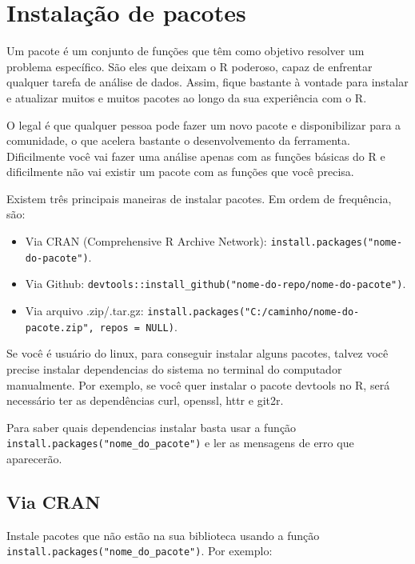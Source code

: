 \documentclass[
]{book}
\providecommand{\tightlist}{%
  \setlength{\itemsep}{0pt}\setlength{\parskip}{0pt}}
\begin{document}
\hypertarget{instalauxe7uxe3o-de-pacotes}{%
\section{Instalação de pacotes}\label{instalauxe7uxe3o-de-pacotes}}

Um pacote é um conjunto de funções que têm como objetivo resolver um problema específico. São eles que deixam o R poderoso, capaz de enfrentar qualquer tarefa de análise de dados. Assim, fique bastante à vontade para instalar e atualizar muitos e muitos pacotes ao longo da sua experiência com o R.

O legal é que qualquer pessoa pode fazer um novo pacote e disponibilizar para a comunidade, o que acelera bastante o desenvolvemento da ferramenta. Dificilmente você vai fazer uma análise apenas com as funções básicas do R e dificilmente não vai existir um pacote com as funções que você precisa.

Existem três principais maneiras de instalar pacotes. Em ordem de frequência, são:

\begin{itemize}
\tightlist
\item
  Via CRAN (Comprehensive R Archive Network): \texttt{install.packages("nome-do-pacote")}.
\item
  Via Github: \texttt{devtools::install\_github("nome-do-repo/nome-do-pacote")}.
\item
  Via arquivo .zip/.tar.gz: \texttt{install.packages("C:/caminho/nome-do-pacote.zip",\ repos\ =\ NULL)}.
\end{itemize}

Se você é usuário do linux, para conseguir instalar alguns pacotes, talvez você precise instalar dependencias do sistema no terminal do computador manualmente. Por exemplo, se você quer instalar o pacote devtools no R, será necessário ter as dependências curl, openssl, httr e git2r.

Para saber quais dependencias instalar basta usar a função \texttt{install.packages("nome\_do\_pacote")} e ler as mensagens de erro que aparecerão.

\hypertarget{via-cran}{%
\subsection{Via CRAN}\label{via-cran}}

Instale pacotes que não estão na sua biblioteca usando a função \texttt{install.packages("nome\_do\_pacote")}. Por exemplo:
\end{document}
